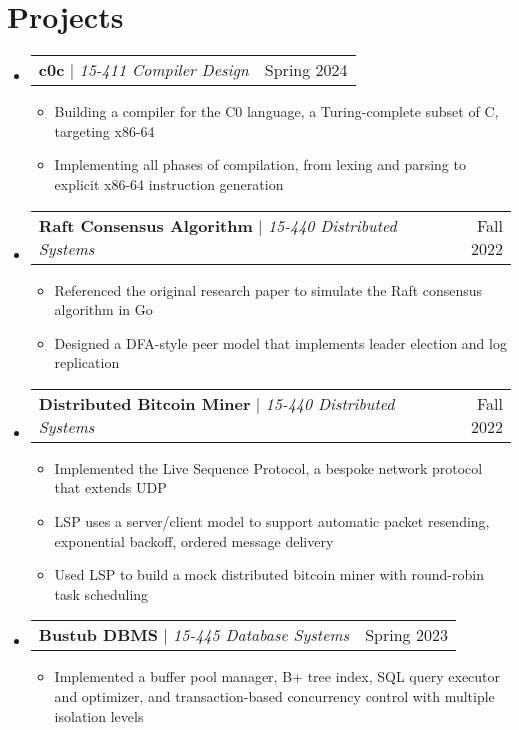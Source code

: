\documentclass[letterpaper,11pt]{article}
\makeatletter
\newcommand{\resumeItem}[1]{
  \item\small{
    {#1 \vspace{-2pt}}
  }
}
\newcommand{\resumeProjectHeading}[2]{
    \item
    \begin{tabular*}{0.97\textwidth}{l@{\extracolsep{\fill}}r}
      \small#1 & #2 \\
    \end{tabular*}\vspace{-7pt}
}
\newcommand{\resumeSubHeadingListStart}{\begin{itemize}[leftmargin=0.15in, label={}]}
\newcommand{\resumeSubHeadingListEnd}{\end{itemize}}
\newcommand{\resumeItemListStart}{\begin{itemize}}
\newcommand{\resumeItemListEnd}{\end{itemize}\vspace{-5pt}}
\makeatother
\begin{document}
\section{Projects}
    \resumeSubHeadingListStart
      \resumeProjectHeading
          {\textbf{c0c} $|$ \emph{15-411 Compiler Design}}{Spring 2024}
          \resumeItemListStart
            \resumeItem{Building a compiler for the C0 language, a Turing-complete subset of C, targeting x86-64}
            \resumeItem{Implementing all phases of compilation, from lexing and parsing to explicit x86-64 instruction generation}
          \resumeItemListEnd
          \resumeProjectHeading
          {\textbf{Raft Consensus Algorithm} $|$ \emph{15-440 Distributed Systems}}{Fall 2022}
          \resumeItemListStart
          \resumeItem{Referenced the original research paper to simulate the Raft consensus algorithm in Go}
          \resumeItem{Designed a DFA-style peer model that implements leader election and log replication}
          \resumeItemListEnd
          \resumeProjectHeading
          {\textbf{Distributed Bitcoin Miner} $|$ \emph{15-440 Distributed Systems}}{Fall 2022}
          \resumeItemListStart
          \resumeItem{Implemented the Live Sequence Protocol, a bespoke network protocol that extends UDP}
          \resumeItem{LSP uses a server/client model to support automatic packet resending, exponential backoff, ordered message delivery}
          \resumeItem{Used LSP to build a mock distributed bitcoin miner with round-robin task scheduling}
          \resumeItemListEnd
      \resumeProjectHeading
          {\textbf{Bustub DBMS} $|$ \emph{15-445 Database Systems}}{Spring 2023}
          \resumeItemListStart
            \resumeItem{Implemented a buffer pool manager, B+ tree index, SQL query executor and optimizer, and transaction-based concurrency control with multiple isolation levels}
          \resumeItemListEnd
    \resumeSubHeadingListEnd
\end{document}

